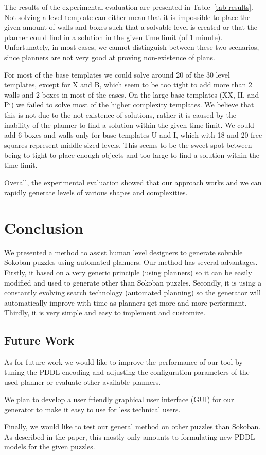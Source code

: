 \documentclass[runningheads]{llncs}
\begin{document}
The results of the experimental evaluation are presented in Table~\ref{tab-results}.
Not solving a level template can either mean that it is impossible to place the given amount of walls
and boxes such that a solvable level is created or that the planner could find in a solution in the given
time limit (of 1 minute). Unfortunately, in most cases, we cannot distinguish between these two scenarios,
since planners are not very good at proving non-existence of plans.

For most of the base templates we could solve around 20 of the 30 level templates, except for X and B,
which seem to be too tight to add more than 2 walls and 2 boxes in most of the cases.
On the large base templates (XX, II, and Pi) we failed to solve most of the higher complexity templates. We
believe that this is not due to the not existence of solutions, rather it is caused by the inability of
the planner to find a solution within the given time limit.
We could add 6 boxes and walls only for base templates U and I, which with 18 and 20 free squares
represent middle sized levels. This seems to be the sweet spot between being to tight to place
enough objects and too large to find a solution within the time limit.

Overall, the experimental evaluation showed that our approach works and we can rapidly
generate levels of various shapes and complexities. 

\section{Conclusion}
We presented a method to assist human level designers to generate solvable Sokoban
puzzles using automated planners. Our method has several advantages. Firstly,
it based on a very generic principle (using planners) so it can be easily modified and used
to generate other than Sokoban puzzles. Secondly, it is using a constantly
evolving search technology (automated planning) so the generator will automatically
improve with time as planners get more and more performant. Thirdly, it is very simple
and easy to implement and customize.

\subsection{Future Work}
As for future work we would like to improve the performance of our tool by tuning the PDDL
encoding and adjusting the configuration parameters of the used planner or evaluate
other available planners.

We plan to develop a user friendly graphical user interface (GUI) for our generator
to make it easy to use for less technical users.

Finally, we would like to test our general method on other puzzles than Sokoban. As described in
the paper, this mostly only amounts to formulating new PDDL models for the given puzzles.

%
%
%


%
\end{document}
